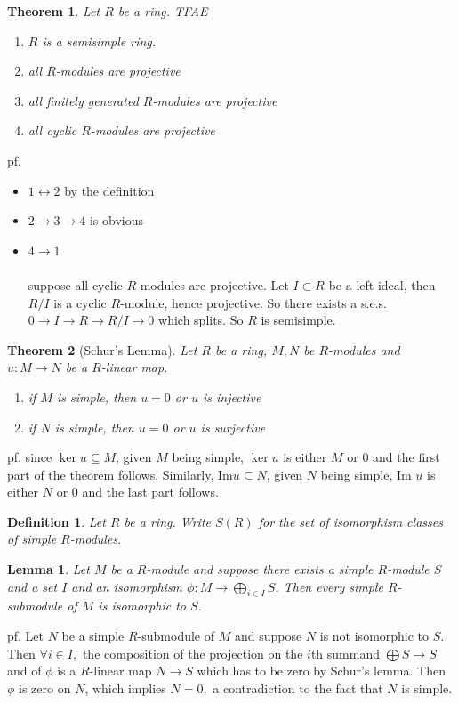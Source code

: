 \documentclass[12pt,letterpaper]{report}
\newtheorem{definition}{Definition}[section]
\newtheorem{lemma}{Lemma}[section]
\newtheorem{theorem}{Theorem}[section]
\begin{document}
\begin{theorem}Let $R$ be a ring. TFAE\begin{enumerate}\item $R$ is a semisimple ring.\item all $R$-modules are projective\item all finitely generated $R$-modules are projective\item all cyclic $R$-modules are projective\end{enumerate}\end{theorem}
pf.\begin{itemize}\item $1\leftrightarrow 2$ by the definition
\item $2\rightarrow3\rightarrow 4$ is obvious
\item $4\rightarrow 1
$\\\\suppose all cyclic $R$-modules are projective. Let $I\subset R$ be a left ideal, then $R/I$ is a cyclic $R$-module, hence projective. So there exists a s.e.s. $0\rightarrow I\rightarrow R\rightarrow R/I\rightarrow0$ which splits. So $R$ is semisimple. 



\end{itemize}
\begin{theorem}[Schur's Lemma]Let $R$ be a ring, $M,N$ be $R$-modules and $u:M\rightarrow N$ be a $R$-linear map. \begin{enumerate}\item if $M$ is simple, then $u=0$ or $u$ is injective\item if $N$ is simple, then $u=0$ or $u$ is surjective\end{enumerate}\end{theorem}
pf. since $\ker u\subseteq M$, given $M$ being simple, $\ker u$ is either $M$ or 0 and the first part of the theorem follows. Similarly, Im$u\subseteq N$, given $N$ being simple, Im $u$ is either $N$ or 0 and the last part follows. 




\begin{definition}Let $R$ be a ring. Write $S(R)$ for the set of isomorphism classes of simple $R$-modules.\end{definition}
\begin{lemma}Let $M$ be a $R$-module and suppose there exists a simple $R$-module $S$ and a set $I$ and an isomorphism $\phi:M\rightarrow\bigoplus_{i\in I}S$. Then every simple $R$-submodule of $M$ is isomorphic to $S$.\end{lemma}
pf. Let $N$ be a simple $R$-submodule of $M$ and suppose $N$ is not isomorphic to $S$. Then $\forall i\in I,$ the composition of the projection on the $i$th summand $\bigoplus S\rightarrow S$ and of $\phi$ is a $R$-linear map $N\rightarrow S$ which has to be zero by Schur's lemma. Then $\phi$ is zero on $N$, which implies $N=0,$ a contradiction to the fact that $N$ is simple.
\end{document}
